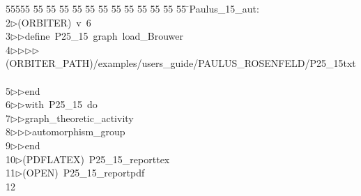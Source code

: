 %
%
\begin{tabbing}
55555 \= 55 \= 55 \= 55 \= 55 \= 55 \= 55 \= 55 \= 55 \= 55 \= 55 \= 55 \= 55 \= \>Paulus\_15\_aut:\\[0pt]
2\>$\triangleright$\>(ORBITER)\ v\ 6\ \\[0pt]
3\>$\triangleright$\>$\triangleright$\>define\ P25\_15\ graph\ load\_Brouwer\ \\[0pt]
4\>$\triangleright$\>$\triangleright$\>$\triangleright$\>$\triangleright$\>(ORBITER\_PATH)/examples/users\_guide/PAULUS\_ROSENFELD/P25\_15txt\ \\[0pt]
5\>$\triangleright$\>$\triangleright$\>end\ \\[0pt]
6\>$\triangleright$\>$\triangleright$\>with\ P25\_15\ do\ \\[0pt]
7\>$\triangleright$\>$\triangleright$\>graph\_theoretic\_activity\ \\[0pt]
8\>$\triangleright$\>$\triangleright$\>$\triangleright$\>automorphism\_group\ \\[0pt]
9\>$\triangleright$\>$\triangleright$\>end\\[0pt]
10\>$\triangleright$\>(PDFLATEX)\ P25\_15\_reporttex\\[0pt]
11\>$\triangleright$\>(OPEN)\ P25\_15\_reportpdf\\[0pt]
12\>\end{tabbing}
